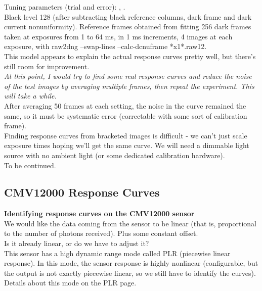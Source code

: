 {Tuning parameters (trial and error): , .\\

Black level 128 (after subtracting black reference columns, dark frame and dark current nonuniformity). Reference frames obtained from fitting 256 dark frames taken at exposures from 1 to 64 ms, in 1 ms increments, 4 images at each exposure, with raw2dng --swap-lines --calc-dcnuframe *x1*.raw12.\\

This model appears to explain the actual response curves pretty well, but there's still room for improvement. \\

\textit{At this point, I would try to find some real response curves and reduce the noise of the test images by averaging multiple frames, then repeat the experiment. This will take a while.}\\

After averaging 50 frames at each setting, the noise in the curve remained the same, so it must be systematic error (correctable with some sort of calibration frame).\\

Finding response curves from bracketed images is difficult - we can't just scale exposure times hoping we'll get the same curve. We will need a dimmable light source with no ambient light (or some dedicated calibration hardware).\\


To be continued. 








\subsection{CMV12000 Response Curves}

\textbf{Identifying response curves on the CMV12000 sensor }\\

We would like the data coming from the sensor to be linear (that is, proportional to the number of photons received). Plus some constant offset.\\

Is it already linear, or do we have to adjust it?\\

This sensor has a high dynamic range mode called PLR (piecewise linear response). In this mode, the sensor response is highly nonlinear (configurable, but the output is not exactly piecewise linear, so we still have to identify the curves). Details about this mode on the PLR page.\\

}
